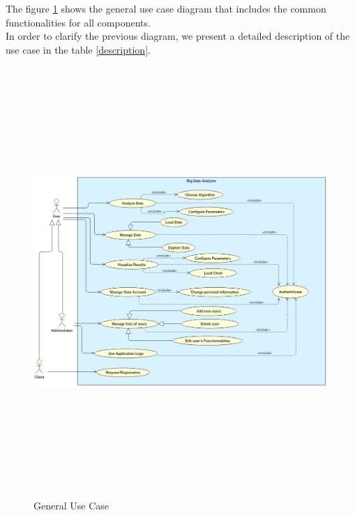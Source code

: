 The figure \ref{user} shows the general use case diagram that includes the common functionalities for all components.\\

In order to clarify the previous diagram, we present a detailed description of the use case in the table \ref{description}.
\begin{figure}[H]
\begin{center}
\includegraphics[width=17cm,height=16.3cm]{chapter3/userrusecase.png}
\end{center}
\caption{General Use Case}
\label{user}
\end{figure}

